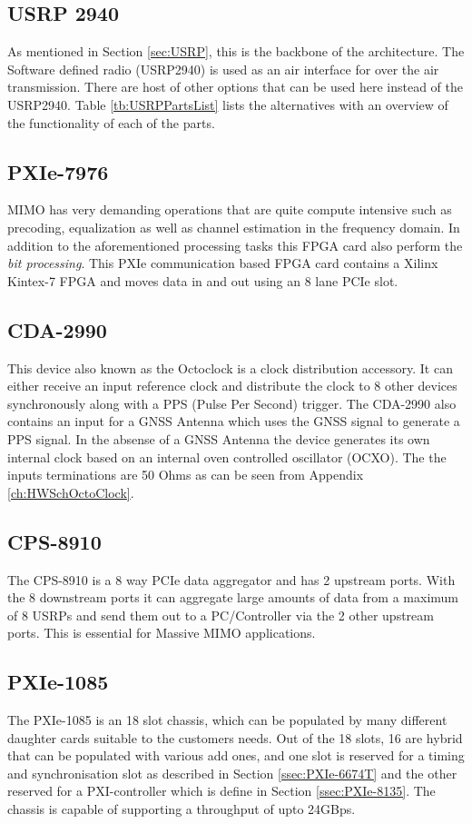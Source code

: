 \subsection{USRP 2940}\label{sec:MIMOAFWUSRP}
As mentioned in Section \ref{sec:USRP}, this is the backbone of the architecture. The Software defined radio (USRP2940) is used as an air interface for over the air transmission. There are host of other options that can be used here instead of the USRP2940. Table \ref{tb:USRPPartsList} lists the alternatives with an overview of the functionality of each of the parts.

\subsection{PXIe-7976}\label{ssec:PXIe-7976}
MIMO has very demanding operations that are quite compute intensive such as precoding, equalization as well as channel estimation in the frequency domain. In addition to the aforementioned processing tasks this FPGA card also perform the \emph{bit processing}. This PXIe communication based FPGA card contains a Xilinx Kintex-7 FPGA and moves data in and out using an 8 lane PCIe slot.

\subsection{CDA-2990}\label{ssec:CDA-2990}
This device also known as the Octoclock is a clock distribution accessory. It can either receive an input reference clock and distribute the clock to 8 other devices synchronously along with a PPS (Pulse Per Second) trigger. The CDA-2990 also contains an input for a GNSS Antenna which uses the GNSS signal to generate a PPS signal. In the absense of a GNSS Antenna the device generates its own internal clock based on an internal oven controlled oscillator (OCXO). The the inputs terminations are 50 Ohms as can be seen from Appendix \ref{ch:HWSchOctoClock}.

\subsection{CPS-8910}\label{ssec:CPS-8910}
The CPS-8910 is a 8 way PCIe data aggregator and has 2 upstream ports. With the 8 downstream ports it can aggregate large amounts of data from a maximum of 8 USRPs and send them out to a PC/Controller via the 2 other upstream ports. This is essential for Massive MIMO applications.

\subsection{PXIe-1085}\label{ssec:PXIe-1085}
The PXIe-1085 is an 18 slot chassis, which can be populated by many different daughter cards suitable to the customers needs. Out of the 18 slots, 16 are hybrid that can be populated with various add ones, and one slot is reserved for a timing and synchronisation slot as described in Section \ref{ssec:PXIe-6674T} and the other reserved for a PXI-controller which is define in Section \ref{ssec:PXIe-8135}. The chassis is capable of supporting a throughput of upto 24GBps.

